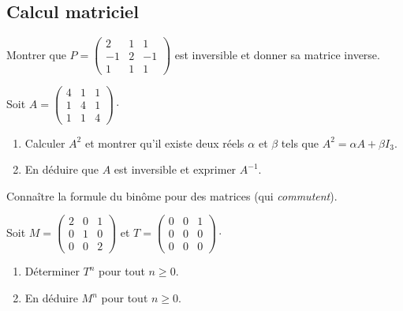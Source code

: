 \documentclass[a4paper,twoside,french,10pt]{VcCours}
\begin{document}
\subsection{Calcul matriciel}

\medskip

\begin{Exercice}{}\end{Exercice} Montrer que $P = \begin{pmatrix}
2 & 1 & 1 \\
-1 & 2 & -1 \\
1 & 1 & 1
\end{pmatrix}$ est inversible et donner sa matrice inverse.

\medskip

\begin{Exercice}{}\end{Exercice} 
Soit $A = \begin{pmatrix} 4&1&1\\1&4&1\\1&1&4\end{pmatrix} \cdot$
\begin{enumerate}
 \item Calculer $A^2$ et montrer qu'il existe deux réels $\alpha$ et $\beta$ tels que $A^2 = \alpha A + \beta I_3$.
 \item En déduire que $A$ est inversible et exprimer $A^{-1}$.
\end{enumerate}

\medskip

\begin{ptc}{}
	Connaître la formule du binôme pour des matrices (qui \textit{commutent}).
\end{ptc}

\begin{Exercice}{}\end{Exercice} Soit $M = \begin{pmatrix}
2 & 0 & 1 \\
0 & 1 & 0 \\
0 & 0 & 2
\end{pmatrix}$ et $T= \begin{pmatrix}
0 & 0 & 1 \\
0 & 0 & 0 \\
0 & 0 & 0
\end{pmatrix}\cdot$

\begin{enumerate}
\item Déterminer $T^n$ pour tout $n \geq 0$.
\item En déduire $M^n$ pour tout $n \geq 0$.
\end{enumerate}
\end{document}

